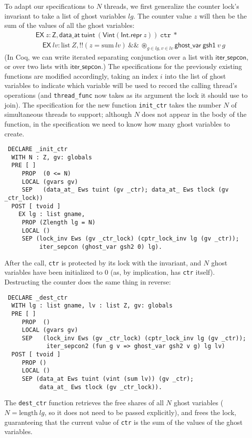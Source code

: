 \documentclass[11pt]{article}
\begin{document}
To adapt our specifications to $N$ threads, we first generalize the counter lock's invariant to take a list of ghost variables $\mathit{lg}$. The counter value $z$ will then be the sum of the values of all the ghost variables:
\begin{align*}&\mathsf{EX}\ z : \mathsf{Z}, \mathsf{data\_at}\ \mathsf{tuint}\ (\mathsf{Vint} (\mathsf{Int.repr}\ z))\ \texttt{ctr}\ * \\&\quad\mathsf{EX}\ \mathit{lv} : \mathrm{list}\ Z, !!(z = \mathrm{sum}\ \mathit{lv}) \ \&\&\ \circledast_{g \in \mathit{lg}, v \in \mathit{lv}} \mathsf{ghost\_var}\ \mathsf{gsh1}\ v\ g\end{align*}
(In Coq, we can write iterated separating conjunction over a list with $\mathsf{iter\_sepcon}$, or over two lists with $\mathsf{iter\_sepcon}$.) The specifications for the previously existing functions are modified accordingly, taking an index $i$ into the list of ghost variables to indicate which variable will be used to record the calling thread's operations (and \texttt{thread\_func} now takes as its argument the lock it should use to join). The specification for the new function \texttt{init\_ctr} takes the number $N$ of simultaneous threads to support; although $N$ does not appear in the body of the function, in the specification we need to know how many ghost variables to create.
\begin{verbatim}
 DECLARE _init_ctr
  WITH N : Z, gv: globals
  PRE [ ]
     PROP  (0 <= N)
     LOCAL (gvars gv)
     SEP   (data_at_ Ews tuint (gv _ctr); data_at_ Ews tlock (gv _ctr_lock))
  POST [ tvoid ]
    EX lg : list gname,
     PROP (Zlength lg = N)
     LOCAL ()
     SEP (lock_inv Ews (gv _ctr_lock) (cptr_lock_inv lg (gv _ctr));
          iter_sepcon (ghost_var gsh2 0) lg).
\end{verbatim}
After the call, \texttt{ctr} is protected by its lock with the invariant, and $N$ ghost variables have been initialized to 0 (as, by implication, has \texttt{ctr} itself). Destructing the counter does the same thing in reverse:
\begin{verbatim}
 DECLARE _dest_ctr
  WITH lg : list gname, lv : list Z, gv: globals
  PRE [ ]
     PROP  ()
     LOCAL (gvars gv)
     SEP   (lock_inv Ews (gv _ctr_lock) (cptr_lock_inv lg (gv _ctr));
            iter_sepcon2 (fun g v => ghost_var gsh2 v g) lg lv)
  POST [ tvoid ]
     PROP ()
     LOCAL ()
     SEP (data_at Ews tuint (vint (sum lv)) (gv _ctr);
          data_at_ Ews tlock (gv _ctr_lock)).
\end{verbatim}
The \texttt{dest\_ctr} function retrieves the free shares of all $N$ ghost variables ($N = \mathrm{length}\ \mathit{lg}$, so it does not need to be passed explicitly), and frees the lock, guaranteeing that the current value of \texttt{ctr} is the sum of the values of the ghost variables.
\end{document}
